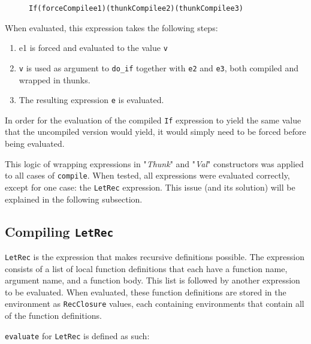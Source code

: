 \begin{figure}[H]
\begin{alltt}
  If (forceCompile e1) (thunkCompile e2) (thunkCompile e3)
\end{alltt}
\end{figure}

\noindent When evaluated, this expression takes the following steps:

\begin{enumerate}
\item e1 is forced and evaluated to the value \texttt{v}
\item \texttt{v} is used as argument to \texttt{do\_if} together with \texttt{e2} and \texttt{e3}, both compiled and wrapped in thunks.
\item The resulting expression \texttt{e} is evaluated.
\end{enumerate}

\noindent In order for the evaluation of the compiled \texttt{If} expression to
yield the same value that the uncompiled version would yield, it would simply
need to be forced before being evaluated.

This logic of wrapping expressions in "\textit{Thunk}" and "\textit{Val}"
constructors was applied to all cases of \texttt{compile}. When tested, all
expressions were evaluated correctly, except for one case: the \texttt{LetRec}
expression. This issue (and its solution) will be explained in the following
subsection.

\subsection{Compiling \texttt{LetRec}}
\texttt{LetRec} is the expression that makes recursive definitions possible.
The expression consists of a list of local function definitions that each have a
function name, argument name, and a function body. This list is followed by
another expression to be evaluated. When evaluated, these function definitions
are stored in the environment as \texttt{RecClosure} values, each containing
environments that contain all of the function definitions.

\texttt{evaluate} for \texttt{LetRec} is defined as such:

